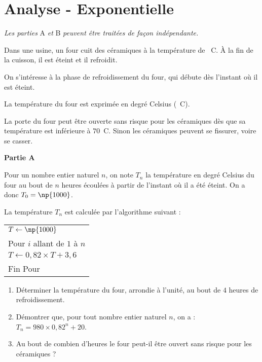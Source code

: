 \documentclass{cornouaille}
\begin{document}
\tableofcontents

\section{Analyse - Exponentielle}
\begin{exercice}


\emph{Les parties } A \emph{et}   B \emph{peuvent être traitées de façon indépendante.}

\bigskip


Dans une usine, un four cuit des céramiques à la température de ~\degres C. À la fin de la
cuisson, il est éteint et il refroidit.

\smallskip

On s'intéresse à la phase de refroidissement du four, qui débute dès l'instant où il est éteint.

\smallskip
La température du four est exprimée en degré Celsius (\degres~C).

\smallskip

La porte du four peut être ouverte sans risque pour les céramiques dès que sa température est
inférieure à $70$\degres~C. Sinon les céramiques peuvent se fissurer, voire se casser.

\bigskip

\textbf{Partie A}

\medskip

Pour un nombre entier naturel $n$, on note $T_n$ la température en degré Celsius du four au bout
de $n$ heures écoulées à partir de l'instant où il a été éteint. On a donc $T_0 = \np{1000}$.

La température $T_n$ est calculée par l'algorithme suivant :

\begin{center}
\begin{tabularx}{0.35\linewidth}{|X|}\hline
$T \gets \np{1000}$\\
Pour $i$ allant de $1$ à $n$\\
\hspace{1cm}$T \gets 0,82 \times T + 3,6$\\
Fin Pour\\\hline
\end{tabularx}
\end{center}

\medskip

\begin{enumerate}
\item Déterminer la température du four, arrondie à l'unité, au bout de $4$ heures de
refroidissement.
\item  Démontrer que, pour tout nombre entier naturel $n$, on a : $T_n = 980 \times 0,82^n + 20$.
\item  Au bout de combien d'heures le four peut-il être ouvert sans risque pour les céramiques ?
 \end{enumerate}
 

\end{exercice}
\end{document}
